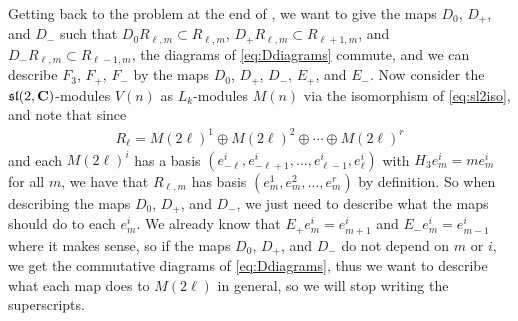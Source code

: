 Getting back to the problem at the end of , we want to give the maps $D_0$, $D_+$, and $D_-$ such that $D_0R_{\ell,m}\subset R_{\ell,m}$, $D_+R_{\ell,m}\subset R_{\ell+1,m}$, and $D_-R_{\ell,m}\subset R_{\ell-1,m}$, the diagrams of \cref{eq:Ddiagrams} commute, and we can describe $F_3$, $F_+$, $F_-$ by the maps $D_0$, $D_+$, $D_-$, $E_+$, and $E_-$. Now consider the $\mathfrak{sl}(2,\mathbf{C})$-modules $V(n)$ as $L_k$-modules $M(n)$ via the isomorphism of \cref{eq:sl2iso}, and note that since
\begin{align*}
  R_\ell = M(2\ell)^1 \oplus M(2\ell)^2 \oplus \dotsb \oplus M(2\ell)^r
\end{align*}
and each $M(2\ell)^{i}$ has a basis $(e_{-\ell}^{i},e_{-\ell+1}^{i},\dotsc,e_{\ell-1}^{i},e_{\ell}^{i})$ with $H_3e_m^{i} = m e_m^{i}$ for all $m$, we have that $R_{\ell,m}$ has basis $(e_m^1,e_m^2,\dotsc,e_m^r)$ by definition. So when describing the maps $D_0$, $D_+$, and $D_-$, we just need to describe what the maps should do to each $e_m^{i}$. We already know that $E_+e_m^{i}=e_{m+1}^{i}$ and $E_-e_m^{i}=e_{m-1}^{i}$ where it makes sense, so if the maps $D_0$, $D_+$, and $D_-$ do not depend on $m$ or $i$, we get the commutative diagrams of \cref{eq:Ddiagrams}, thus we want to describe what each map does to $M(2\ell)$ in general, so we will stop writing the superscripts.

